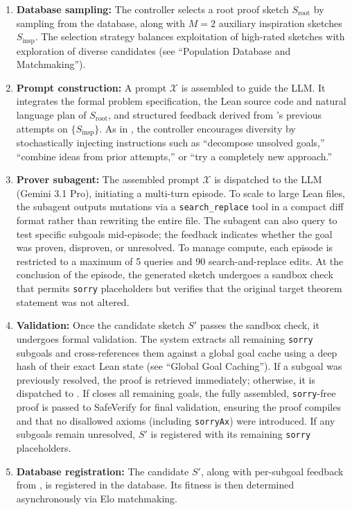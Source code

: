 \begin{enumerate} 
\setlength{\itemsep}{8pt}
\setlength{\parsep}{2pt}
\item \textbf{Database sampling:} The controller selects a root proof sketch $S_{\text{root}}$ by sampling from the database, along with $M = 2$ auxiliary inspiration sketches ${S_{\text{insp}}}$. The selection strategy balances exploitation of high-rated sketches with exploration of diverse candidates (see ``Population Database and Matchmaking'').

\item \textbf{Prompt construction:} A prompt $\mathcal{X}$ is assembled to guide the LLM. It integrates the formal problem specification, the Lean source code and natural language plan of $S_{\text{root}}$, and structured feedback derived from \AP's previous attempts on $\{S_{\text{insp}}\}$. As in \AEv, the controller encourages diversity by stochastically injecting instructions such as ``decompose unsolved goals,'' ``combine ideas from prior attempts,'' or ``try a completely new approach.''

\item \textbf{Prover subagent:} The assembled prompt $\mathcal{X}$ is dispatched to the LLM (Gemini 3.1 Pro), initiating a multi-turn episode. To scale to large Lean files, the subagent outputs mutations via a \texttt{search\_replace} tool in a compact diff format rather than rewriting the entire file. The subagent can also query {\AP} to test specific subgoals mid-episode; the feedback indicates whether the goal was proven, disproven, or unresolved. To manage compute, each episode is restricted to a maximum of 5 {\AP} queries and 90 search-and-replace edits. At the conclusion of the episode, the generated sketch undergoes a sandbox check that permits \texttt{sorry} placeholders but verifies that the original target theorem statement was not altered.

\item \textbf{Validation:} Once the candidate sketch $S'$ passes the sandbox check, it undergoes formal validation. The system extracts all remaining \texttt{sorry} subgoals and cross-references them against a global goal cache using a deep hash of their exact Lean state (see ``Global Goal Caching''). If a subgoal was previously resolved, the proof is retrieved immediately; otherwise, it is dispatched to {\AP}. If {\AP} closes all remaining goals, the fully assembled, \texttt{sorry}-free proof is passed to SafeVerify \cite{SafeVerify2025} for final validation, ensuring the proof compiles and that no disallowed axioms (including \texttt{sorryAx}) were introduced. If any subgoals remain unresolved, $S'$ is registered with its remaining \texttt{sorry} placeholders.

\item \textbf{Database registration:} The candidate $S'$, along with per-subgoal feedback from {\AP}, is registered in the database. Its fitness is then determined asynchronously via Elo matchmaking.
\end{enumerate}

